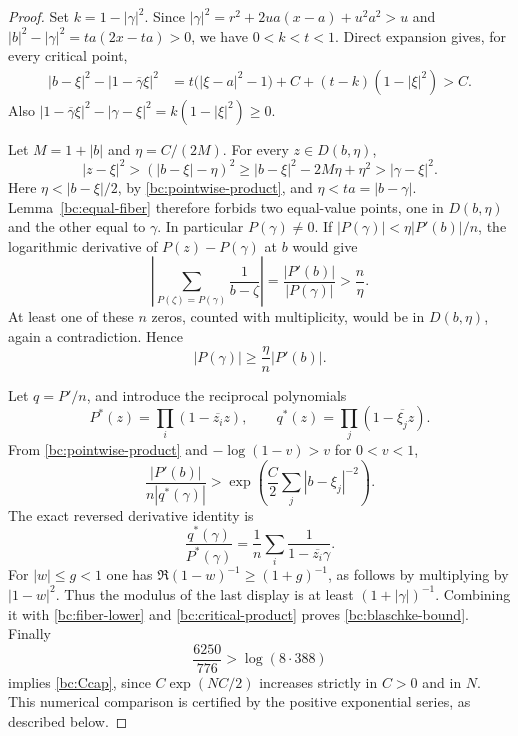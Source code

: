 \begin{proof}
Set $k=1-|\gamma|^2$.  Since
$|\gamma|^2=r^2+2ua(x-a)+u^2a^2>u$ and
$|b|^2-|\gamma|^2=ta(2x-ta)>0$, we have $0<k<t<1$.
Direct expansion gives, for every critical point,
\begin{align}
 |b-\xi|^2-|1-\overline\gamma\xi|^2
 &=t\bigl(|\xi-a|^2-1\bigr)
   +C+(t-k)(1-|\xi|^2)>C.             \label{bc:pointwise-product}
\end{align}
Also $|1-\overline\gamma\xi|^2-|\gamma-\xi|^2
=k(1-|\xi|^2)\geq0$.

Let $M=1+|b|$ and $\eta=C/(2M)$.  For every $z\in D(b,\eta)$,
\[
 |z-\xi|^2>(|b-\xi|-\eta)^2
 \geq |b-\xi|^2-2M\eta+\eta^2>|\gamma-\xi|^2.
\]
Here $\eta<|b-\xi|/2$, by \eqref{bc:pointwise-product}, and
$\eta<ta=|b-\gamma|$.  Lemma~\ref{bc:equal-fiber}
therefore forbids two equal-value points, one in $D(b,\eta)$ and the
other equal to $\gamma$.  In particular $P(\gamma)\ne0$.
If $|P(\gamma)|<\eta|P'(b)|/n$, the logarithmic derivative of
$P(z)-P(\gamma)$ at $b$ would give
\[
 \left|\sum_{P(\zeta)=P(\gamma)}\frac1{b-\zeta}\right|
 =\frac{|P'(b)|}{|P(\gamma)|}>\frac n\eta.
\]
At least one of these $n$ zeros, counted with multiplicity, would be in
$D(b,\eta)$, again a contradiction.  Hence
\begin{equation}\label{bc:fiber-lower}
 |P(\gamma)|\geq\frac{\eta}{n}|P'(b)|.
\end{equation}

Let $q=P'/n$, and introduce the reciprocal polynomials
\[
 P^*(z)=\prod_i(1-\overline{z_i}z),\qquad
 q^*(z)=\prod_j(1-\overline{\xi_j}z).
\]
From \eqref{bc:pointwise-product} and $-\log(1-v)>v$ for $0<v<1$,
\begin{equation}\label{bc:critical-product}
 \frac{|P'(b)|}{n|q^*(\gamma)|}>
 \exp\left(\frac C2\sum_j|b-\xi_j|^{-2}\right).
\end{equation}
The exact reversed derivative identity is
\[
 \frac{q^*(\gamma)}{P^*(\gamma)}
 =\frac1n\sum_i\frac1{1-\overline{z_i}\gamma}.
\]
For $|w|\leq g<1$ one has $\Re(1-w)^{-1}\geq(1+g)^{-1}$,
as follows by multiplying by $|1-w|^2$.  Thus the modulus of the last
display is at least $(1+|\gamma|)^{-1}$.  Combining it with
\eqref{bc:fiber-lower} and \eqref{bc:critical-product} proves
\eqref{bc:blaschke-bound}.  Finally
\[
 \frac{6250}{776}>\log(8\cdot388)
\]
implies \eqref{bc:Ccap}, since $C\exp(NC/2)$ increases strictly in
$C>0$ and in $N$.  This numerical comparison is certified by the
positive exponential series, as described below.
\end{proof}

